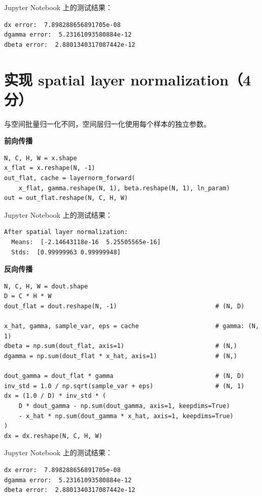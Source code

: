 Jupyter Notebook 上的测试结果：

\begin{lstlisting}[style=cleanpython]
dx error:  7.898288656891705e-08
dgamma error:  5.23161093580884e-12
dbeta error:  2.8801340317087442e-12
\end{lstlisting}

\section{实现 spatial layer normalization（4分）}

与空间批量归一化不同，空间层归一化使用每个样本的独立参数。

\textbf{前向传播}

\begin{lstlisting}[style=cleanpython]
N, C, H, W = x.shape
x_flat = x.reshape(N, -1)
out_flat, cache = layernorm_forward(
    x_flat, gamma.reshape(N, 1), beta.reshape(N, 1), ln_param)
out = out_flat.reshape(N, C, H, W)
\end{lstlisting}

Jupyter Notebook 上的测试结果：

\begin{lstlisting}[style=cleanpython]
After spatial layer normalization:
  Means:  [-2.14643118e-16  5.25505565e-16]
  Stds:  [0.99999963 0.99999948]
\end{lstlisting}

\textbf{反向传播}

\begin{lstlisting}[style=cleanpython]
N, C, H, W = dout.shape
D = C * H * W
dout_flat = dout.reshape(N, -1)                           # (N, D)

x_hat, gamma, sample_var, eps = cache                     # gamma: (N, 1)
dbeta = np.sum(dout_flat, axis=1)                         # (N,)
dgamma = np.sum(dout_flat * x_hat, axis=1)                # (N,)

dout_gamma = dout_flat * gamma                            # (N, D)
inv_std = 1.0 / np.sqrt(sample_var + eps)                 # (N, 1)
dx = (1.0 / D) * inv_std * (
    D * dout_gamma - np.sum(dout_gamma, axis=1, keepdims=True)
    - x_hat * np.sum(dout_gamma * x_hat, axis=1, keepdims=True)
)
dx = dx.reshape(N, C, H, W)
\end{lstlisting}

Jupyter Notebook 上的测试结果：

\begin{lstlisting}[style=cleanpython]
dx error:  7.898288656891705e-08
dgamma error:  5.23161093580884e-12
dbeta error:  2.8801340317087442e-12
\end{lstlisting}

